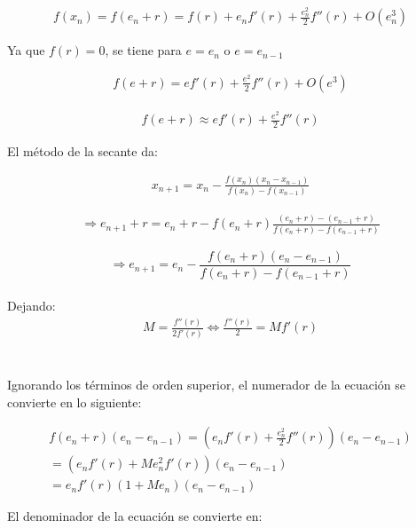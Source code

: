 \begin{gather*}
f(x_{n})= f(e_n+r) = f(r)+e_{n}f'(r)+\frac{e^{2}_n}{2}f''(r)+O(e^{3}_n)
\end{gather*}

Ya que $f(r)=0$, se tiene para $e=e_n$ o $e=e_{n-1}$

\begin{gather*}
f(e+r)= e f'(r)+\frac{e^{2}}{2}f''(r)+O(e^{3})
\end{gather*}

\begin{gather*}
f(e+r) \approx e f'(r)+\frac{e^{2}}{2}f''(r)
\end{gather*}

El método de la secante da:

\begin{gather*}
x_{n+1 }= x_{n} - \frac{f(x_{n})(x_{n}-x_{n-1})}{f(x_{n})-f(x_{n-1})} 
\end{gather*}

\begin{gather*}
\Rightarrow e_{n+1}+r= e_{n} + r - f(e_n + r) \frac{(e_n +r) -(e_{n-1}+r)}{f(e_n + r)-f(e_{n-1} + r)} 
\end{gather*}

\begin{equation}
    \label{secant_eq3}
\Rightarrow e_{n+1}= e_{n} - \frac{f(e_n + r)(e_n - e_{n-1})}{f(e_n + r)-f(e_{n-1} + r)} 
\end{equation}\\

Dejando:\\

\begin{gather*}
M= \frac{f''(r)}{2f'(r)} \Leftrightarrow \frac{f''(r)}{2} = Mf'(r)
\end{gather*}\\\\

Ignorando los términos de orden superior, el numerador de la ecuación  se convierte en lo siguiente:

\begin{gather*}
    f(e_n +r)(e_n - e_{n-1})= (e_nf'(r)+\frac{e^{2}_n}{2}f''(r))(e_n -e_{n-1}) \\
    = (e_nf'(r)+Me^{2}_nf'(r))(e_n -e_{n-1}) \\
    = e_nf'(r)(1+Me_n)(e_n -e_{n-1})
\end{gather*} 

El denominador de la ecuación  se convierte en:


